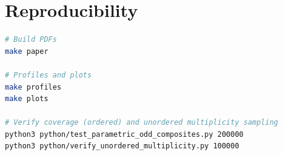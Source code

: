 \documentclass[12pt]{article}
\theoremstyle{definition}
\theoremstyle{plain}
\theoremstyle{remark}
\begin{document}
\section{Reproducibility}
\begin{lstlisting}[language=bash]
# Build PDFs
make paper

# Profiles and plots
make profiles
make plots

# Verify coverage (ordered) and unordered multiplicity sampling
python3 python/test_parametric_odd_composites.py 200000
python3 python/verify_unordered_multiplicity.py 100000
\end{lstlisting}
\end{document}
